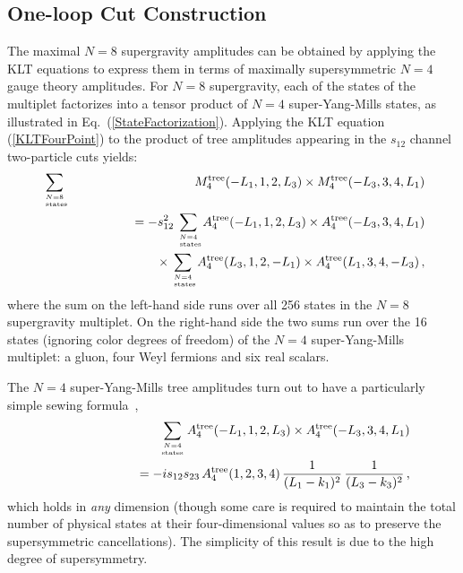 \subsection{One-loop Cut Construction}
\label{subsection:supergravity_cut_construction}

The maximal $N=8$ supergravity amplitudes can be obtained by applying
the KLT equations to express them in terms of maximally supersymmetric
$N=4$ gauge theory amplitudes.  For $N=8$ supergravity, each of the states
of the multiplet factorizes into a tensor product of $N=4$
super-Yang-Mills states, as illustrated in
Eq.~(\ref{StateFactorization}). Applying the KLT equation
(\ref{KLTFourPoint}) to the product of tree amplitudes appearing in
the $s_{12}$ channel two-particle cuts yields:
%
\begin{eqnarray}
\sum_{N=8 \atop \rm\ states}  
&& M_4^{\rm tree}(-L_1,  1, 2, L_3) \times
  M_4^{\rm tree}(-L_3, 3, 4, L_1) \nonumber \\
&& \hskip 1.5 cm  = 
- s_{12}^2 \!\sum_{N=4 \atop \rm\ states} \!
 A_4^{\rm tree}(-L_1,  1, 2, L_3) \times
     A_4^{\rm tree}(-L_3,  3,4 , L_1) \nonumber \\
\null & & \hskip 1.9 truecm
\times
\!\sum_{N=4 \atop \rm\ states} \!
 A_4^{\rm tree}(L_3, 1, 2 , -L_1) \times
                A_4^{\rm tree}(L_1, 3, 4, -L_3) \,,
\label{GravitySewingStart}
\end{eqnarray}
%
where the sum on the left-hand side runs over all 256 states in the
$N=8$ supergravity multiplet. On the right-hand side the two sums run
over the 16 states (ignoring color degrees of freedom) of the $N=4$
super-Yang-Mills multiplet: a gluon, four Weyl fermions and six real
scalars.

The $N=4$ super-Yang-Mills tree amplitudes turn out to have a 
particularly simple sewing formula~\cite{BRY},
%
\begin{eqnarray}
&& \sum_{N=4\atop \rm  states}
 A_4^{\rm tree}(-L_1, 1, 2, L_3) \times
  A_4^{\rm tree}(-L_3, 3, 4, L_1) \nonumber \\
%
&& \hskip 2 cm 
 =  - i s_{12} s_{23} \, A_4^{\rm tree}(1, 2, 3, 4) \, 
   {1\over (L_1 - k_1)^2 } \, 
   {1\over (L_3 - k_3)^2 } \,,
\label{YangMillsSewing}
\end{eqnarray}
%
which holds in {\it any} dimension (though some care is required to maintain
the total number of physical states at their four-dimensional values so
as to preserve the supersymmetric cancellations).
The simplicity of this result is due to the high degree of supersymmetry.

